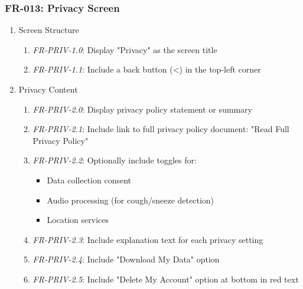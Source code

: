 \documentclass[conference]{IEEEtran}
\begin{document}
            \subsubsection{FR-013: Privacy Screen}
                \begin{enumerate}
                    \item Screen Structure
                        \begin{enumerate}
                            \item \textit{FR-PRIV-1.0}: Display "Privacy" as the screen title
                            \item \textit{FR-PRIV-1.1}: Include a back button (<) in the top-left corner
                        \end{enumerate}
                    \item Privacy Content
                        \begin{enumerate}
                            \item \textit{FR-PRIV-2.0}: Display privacy policy statement or summary
                            \item \textit{FR-PRIV-2.1}: Include link to full privacy policy document: "Read Full Privacy Policy"
                            \item \textit{FR-PRIV-2.2}: Optionally include toggles for:
                                \begin{itemize}
                                    \item Data collection consent
                                    \item Audio processing (for cough/sneeze detection)
                                    \item Location services
                                \end{itemize}
                            \item \textit{FR-PRIV-2.3}: Include explanation text for each privacy setting
                            \item \textit{FR-PRIV-2.4}: Include "Download My Data" option
                            \item \textit{FR-PRIV-2.5}: Include "Delete My Account" option at bottom in red text
                        \end{enumerate}
                \end{enumerate}
\end{document}
